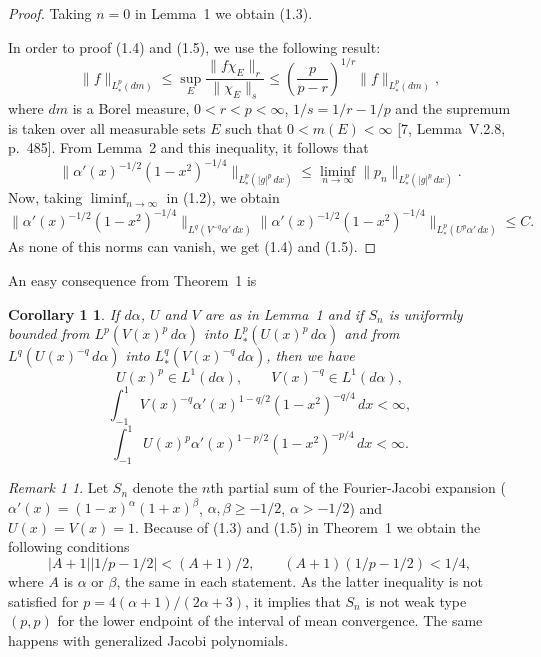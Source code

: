 \documentclass[10pt,a4paper]{article}
\theoremstyle{plain}
\newtheorem*{corOne}{Corollary 1}
\theoremstyle{remark}
\newtheorem*{remOne}{Remark 1}
\begin{document}
\begin{proof}
Taking $n = 0$ in Lemma~1 we obtain (1.3).

In order to proof (1.4) and (1.5), we use the following result:
$$
\|f\|_{L^{p}_{*}(dm)} \leq \sup_{E}
\frac{\|f\chi_{E}\|_{r}}{\|\chi_{E}\|_{s}}
\leq \left(\frac{p}{p-r}\right)^{1/r} \|f\|_{L^{p}_{*}(dm)},
$$
where $dm$ is a Borel measure, $0 < r < p < \infty$,
$1/s = 1/r - 1/p$ and the supremum is taken over all measurable
sets $E$ such that $0 < m(E) < \infty$ [7, Lemma~V.2.8,
p.~485]. From Lemma~2 and this inequality, it follows that
$$
\|\alpha'(x)^{-1/2} (1-x^{2})^{-1/4} \|_{L^{p}_{*}(|g|^{p}\,dx)}
\leq \liminf_{n \to \infty} \|p_{n}\|_{L^{p}_{*}(|g|^{p}\,dx)}.
$$
Now, taking $\liminf_{n \to \infty}$
in (1.2), we obtain
$$
\|\alpha'(x)^{-1/2} (1-x^{2})^{-1/4} \|_{L^{q}(V^{-q}\alpha'\,dx)}
\|\alpha'(x)^{-1/2} (1-x^{2})^{-1/4} \|_{L^{p}_{*}(U^{p}\alpha'\,dx)} \leq C.
$$
As none of this norms can vanish, we get (1.4) and (1.5).
\end{proof}

An easy consequence from Theorem~1 is

\begin{corOne}
If $d\alpha$, $U$ and $V$ are as in Lemma~1 and if
$S_{n}$ is uniformly bounded from $L^{p}(V(x)^{p}\,d\alpha)$ into
$L^{p}_{*}(U(x)^{p}\,d\alpha)$
and from $L^{q}(U(x)^{-q}\,d\alpha)$ into $L^{q}_{*}(V(x)^{-q}\,d\alpha)$,
then we have
\begin{equation}
U(x)^{p} \in L^{1}(d\alpha),\qquad V(x)^{-q} \in L^{1}(d\alpha),
\tag{1.6}
\end{equation}
\begin{equation}
\int_{-1}^{1} V(x)^{-q}\alpha'(x)^{1-q/2} (1-x^{2})^{-q/4}\,dx < \infty,
\tag{1.7}
\end{equation}
\begin{equation}
\int_{-1}^{1} U(x)^{p}\alpha'(x)^{1-p/2} (1-x^{2})^{-p/4}\,dx < \infty.
\tag{1.8}
\end{equation}
\end{corOne}

\begin{remOne}
Let $S_{n}$ denote the $n$th partial sum of the Fourier-Jacobi
expansion ($\alpha'(x) = (1-x)^{\alpha}(1+x)^{\beta}$,
$\alpha, \beta \geq -1/2$, $\alpha > -1/2$)
and $U(x) = V(x) = 1$. Because of (1.3) and (1.5) in Theorem~1
we obtain the following conditions
$$
|A+1| |1/p-1/2| < (A+1)/2,
\qquad (A+1)(1/p-1/2) < 1/4,
$$
where $A$ is $\alpha$ or $\beta$, the same in each statement.
As the latter inequality is not satisfied for $p = 4(\alpha+1)/(2\alpha+3)$,
it implies that $S_{n}$ is not weak type $(p,p)$ for the lower endpoint
of the interval of mean convergence. The same happens with generalized
Jacobi polynomials.
\end{remOne}
\end{document}
